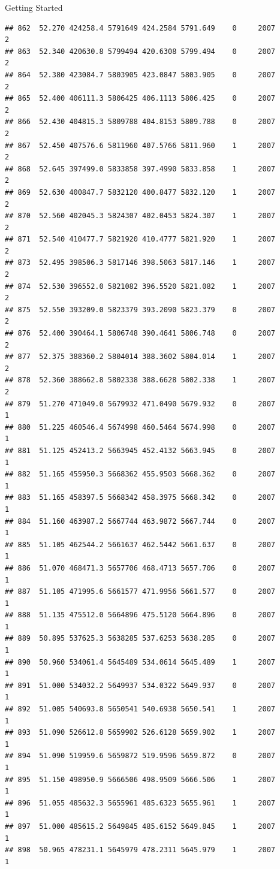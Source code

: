 \documentclass[
  ignorenonframetext,
]{beamer}
\begin{document}
\begin{frame}[fragile]{Getting Started}
\begin{verbatim}
## 862  52.270 424258.4 5791649 424.2584 5791.649    0     2007        2
## 863  52.340 420630.8 5799494 420.6308 5799.494    0     2007        2
## 864  52.380 423084.7 5803905 423.0847 5803.905    0     2007        2
## 865  52.400 406111.3 5806425 406.1113 5806.425    0     2007        2
## 866  52.430 404815.3 5809788 404.8153 5809.788    0     2007        2
## 867  52.450 407576.6 5811960 407.5766 5811.960    1     2007        2
## 868  52.645 397499.0 5833858 397.4990 5833.858    1     2007        2
## 869  52.630 400847.7 5832120 400.8477 5832.120    1     2007        2
## 870  52.560 402045.3 5824307 402.0453 5824.307    1     2007        2
## 871  52.540 410477.7 5821920 410.4777 5821.920    1     2007        2
## 873  52.495 398506.3 5817146 398.5063 5817.146    1     2007        2
## 874  52.530 396552.0 5821082 396.5520 5821.082    1     2007        2
## 875  52.550 393209.0 5823379 393.2090 5823.379    0     2007        2
## 876  52.400 390464.1 5806748 390.4641 5806.748    0     2007        2
## 877  52.375 388360.2 5804014 388.3602 5804.014    1     2007        2
## 878  52.360 388662.8 5802338 388.6628 5802.338    1     2007        2
## 879  51.270 471049.0 5679932 471.0490 5679.932    0     2007        1
## 880  51.225 460546.4 5674998 460.5464 5674.998    0     2007        1
## 881  51.125 452413.2 5663945 452.4132 5663.945    0     2007        1
## 882  51.165 455950.3 5668362 455.9503 5668.362    0     2007        1
## 883  51.165 458397.5 5668342 458.3975 5668.342    0     2007        1
## 884  51.160 463987.2 5667744 463.9872 5667.744    0     2007        1
## 885  51.105 462544.2 5661637 462.5442 5661.637    0     2007        1
## 886  51.070 468471.3 5657706 468.4713 5657.706    0     2007        1
## 887  51.105 471995.6 5661577 471.9956 5661.577    0     2007        1
## 888  51.135 475512.0 5664896 475.5120 5664.896    0     2007        1
## 889  50.895 537625.3 5638285 537.6253 5638.285    0     2007        1
## 890  50.960 534061.4 5645489 534.0614 5645.489    1     2007        1
## 891  51.000 534032.2 5649937 534.0322 5649.937    0     2007        1
## 892  51.005 540693.8 5650541 540.6938 5650.541    1     2007        1
## 893  51.090 526612.8 5659902 526.6128 5659.902    1     2007        1
## 894  51.090 519959.6 5659872 519.9596 5659.872    0     2007        1
## 895  51.150 498950.9 5666506 498.9509 5666.506    1     2007        1
## 896  51.055 485632.3 5655961 485.6323 5655.961    1     2007        1
## 897  51.000 485615.2 5649845 485.6152 5649.845    1     2007        1
## 898  50.965 478231.1 5645979 478.2311 5645.979    1     2007        1

\end{verbatim}
\end{frame}
\end{document}
